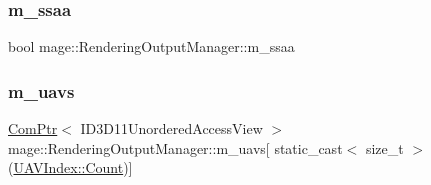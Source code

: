 \subsubsection{\texorpdfstring{m\+\_\+ssaa}{m\_ssaa}}
{\footnotesize\ttfamily bool mage\+::\+Rendering\+Output\+Manager\+::m\+\_\+ssaa\hspace{0.3cm}{\ttfamily [private]}}

\hypertarget{classmage_1_1_rendering_output_manager_ad4e780e6340b18f601a1fcfa9dd1b297}{}\label{classmage_1_1_rendering_output_manager_ad4e780e6340b18f601a1fcfa9dd1b297} 
\subsubsection{\texorpdfstring{m\+\_\+uavs}{m\_uavs}}
{\footnotesize\ttfamily \hyperlink{namespacemage_ae74f374780900893caa5555d1031fd79}{Com\+Ptr}$<$ I\+D3\+D11\+Unordered\+Access\+View $>$ mage\+::\+Rendering\+Output\+Manager\+::m\+\_\+uavs\mbox{[} static\+\_\+cast$<$ size\+\_\+t $>$(\hyperlink{classmage_1_1_rendering_output_manager_a34cdd58dd0dda9d78878d79aa3393b89ae93f994f01c537c4e2f7d8528c3eb5e9}{U\+A\+V\+Index\+::\+Count})\mbox{]}\hspace{0.3cm}{\ttfamily [private]}}

